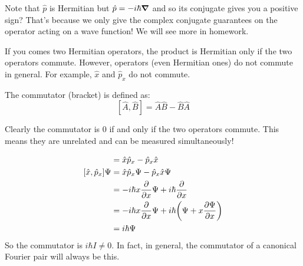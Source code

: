 Note that $\hat{p}$ is Hermitian but $\hat{p} = - i \hbar \grad$ and so its conjugate gives you a positive sign? That's because we only give the complex conjugate
guarantees on the operator acting on a wave function! We will see more in homework.

If you comes two Hermitian operators, the product is Hermitian only if the two operators commute. However, operators (even Hermitian ones) do not commute in general.
For example, $\hat{x}$ and $\hat{p}_x$ do not commute.

\begin{definition}
    The commutator (bracket) is defined as:
    \[ [\hat{A}, \hat{B}] = \hat{A} \hat{B} - \hat{B} \hat{A} \]
\end{definition}
Clearly the commutator is 0 if and only if the two operators commute. This means they are unrelated and can be measured simultaneously!

\begin{align*}
    [\hat{x}, \hat{p}_x] &= \hat{x} \hat{p}_x - \hat{p}_x \hat{x} \\
    [\hat{x}, \hat{p}_x] \Psi &= \hat{x} \hat{p}_x \Psi - \hat{p}_x \hat{x} \Psi \\
    &= - i \hbar x \partialderivative{}{x} \Psi + i \hbar \partialderivative{}{x} (x \Psi) \\
    &= - i \hbar x \partialderivative{}{x} \Psi + i \hbar \qty(\Psi + x \partialderivative{\Psi}{x}) \\
    &= i \hbar \Psi
\end{align*}
So the commutator is $i \hbar I \neq 0$. In fact, in general, the commutator of a canonical Fourier pair will always be this.